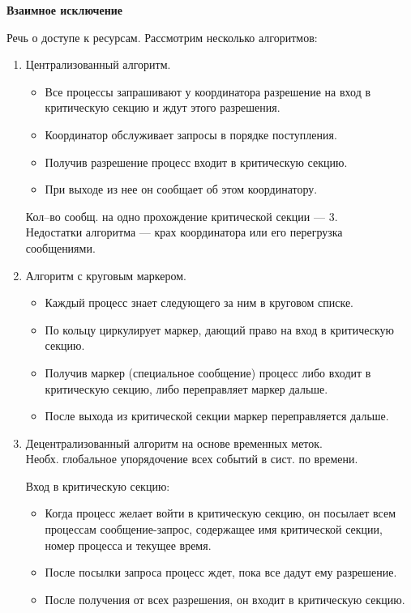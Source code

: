 \centerline{\textbf{Взаимное исключение}}

Речь о доступе к ресурсам. Рассмотрим несколько алгоритмов:
\begin{enumerate}
\item
Централизованный алгоритм.
\begin{itemize}
\item
Все процессы запрашивают у координатора разрешение на вход в критическую секцию и ждут этого разрешения.
\item
Координатор обслуживает запросы в порядке поступления.
\item
Получив разрешение процесс входит в критическую секцию.
\item
При выходе из нее он сообщает об этом координатору.
\end{itemize}
Кол--во сообщ. на одно прохождение критической секции --- 3.
\\
Недостатки алгоритма --- крах координатора или его перегрузка сообщениями.

\item
Алгоритм с круговым маркером.
\begin{itemize}
\item Каждый процесс знает следующего за ним в круговом списке.
\item По кольцу циркулирует маркер, дающий право на вход в критическую секцию.
\item Получив маркер (специальное сообщение) процесс либо входит в критическую секцию, либо переправляет маркер дальше.
\item После выхода из критической секции маркер переправляется дальше.
\end{itemize}

\item
Децентрализованный алгоритм на основе временных меток.
\\
Необх. глобальное упорядочение всех событий в сист. по времени.

Вход в критическую секцию:
\begin{itemize}
\item
Когда процесс желает войти в критическую секцию, он посылает всем процессам сообщение-запрос, содержащее имя критической секции, номер процесса и текущее время.
\item После посылки запроса процесс ждет, пока все дадут ему разрешение.
\item После получения от всех разрешения, он входит в критическую секцию.
\end{itemize}


\end{enumerate}
